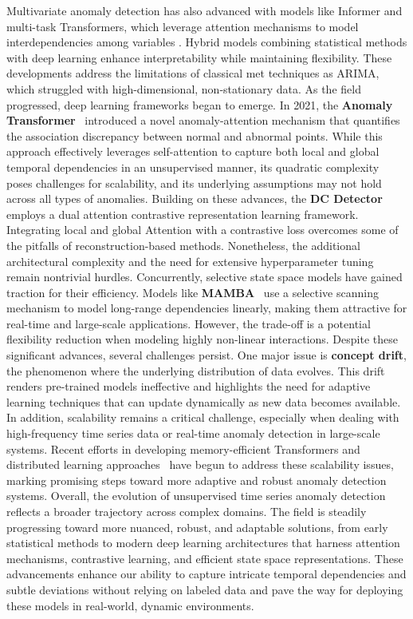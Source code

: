 Multivariate anomaly detection has also advanced with models like Informer \cite{zhou2021informer} and multi-task Transformers, which leverage attention mechanisms to model interdependencies among variables \cite{zhang2021multitask}. Hybrid models combining statistical methods with deep learning enhance interpretability while maintaining flexibility. These developments address the limitations of classical met techniques as ARIMA, which struggled with high-dimensional, non-stationary data.
As the field progressed, deep learning frameworks began to emerge. In 2021, the \textbf{Anomaly Transformer}~\cite{xu2022anomaly} introduced a novel anomaly-attention mechanism that quantifies the association discrepancy between normal and abnormal points. While this approach effectively leverages self-attention to capture both local and global temporal dependencies in an unsupervised manner, its quadratic complexity poses challenges for scalability, and its underlying assumptions may not hold across all types of anomalies.
Building on these advances, the \textbf{DC Detector}~\cite{yang2023dcdetector} employs a dual attention contrastive representation learning framework. Integrating local and global Attention with a contrastive loss overcomes some of the pitfalls of reconstruction-based methods. Nonetheless, the additional architectural complexity and the need for extensive hyperparameter tuning remain nontrivial hurdles.
Concurrently, selective state space models have gained traction for their efficiency. Models like \textbf{MAMBA}~\cite{gu2023mamba} use a selective scanning mechanism to model long-range dependencies linearly, making them attractive for real-time and large-scale applications. However, the trade-off is a potential flexibility reduction when modeling highly non-linear interactions.
Despite these significant advances, several challenges persist. One major issue is \textbf{concept drift}, the phenomenon where the underlying distribution of data evolves. This drift renders pre-trained models ineffective and highlights the need for adaptive learning techniques that can update dynamically as new data becomes available. In addition, scalability remains a critical challenge, especially when dealing with high-frequency time series data or real-time anomaly detection in large-scale systems. Recent efforts in developing memory-efficient Transformers and distributed learning approaches~\cite{gupta2021memory,lai2021revisiting} have begun to address these scalability issues, marking promising steps toward more adaptive and robust anomaly detection systems.
Overall, the evolution of unsupervised time series anomaly detection reflects a broader trajectory across complex domains. The field is steadily progressing toward more nuanced, robust, and adaptable solutions, from early statistical methods to modern deep learning architectures that harness attention mechanisms, contrastive learning, and efficient state space representations. These advancements enhance our ability to capture intricate temporal dependencies and subtle deviations without relying on labeled data and pave the way for deploying these models in real-world, dynamic environments.